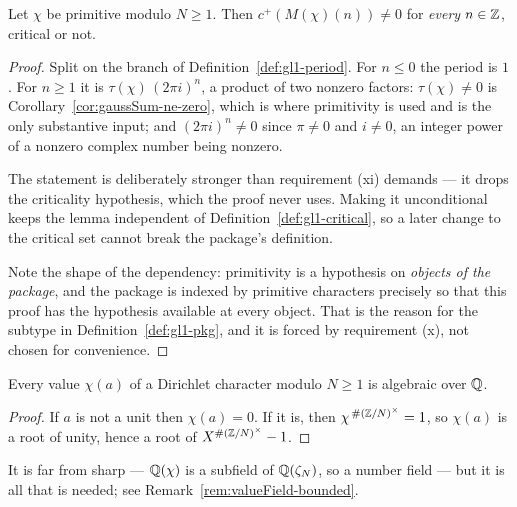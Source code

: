 \begin{lemma}
  \label{lem:gl1-period-ne-zero}
  \leanok
  Let $\chi$ be primitive modulo $N \geq 1$. Then $c^{+}(M(\chi)(n)) \neq 0$ for
  \emph{every} $n \in \mathbb{Z}$, critical or not.
\end{lemma}
\begin{proof}
  \leanok
  Split on the branch of Definition~\ref{def:gl1-period}. For $n \leq 0$ the period is
  $1$. For $n \geq 1$ it is $\tau(\chi)\,(2\pi i)^{n}$, a product of two nonzero
  factors: $\tau(\chi) \neq 0$ is Corollary~\ref{cor:gaussSum-ne-zero}, which is where
  primitivity is used and is the only substantive input; and
  $(2\pi i)^{n} \neq 0$ since $\pi \neq 0$ and $i \neq 0$, an integer power of a
  nonzero complex number being nonzero.

  The statement is deliberately stronger than requirement (xi) demands --- it drops the
  criticality hypothesis, which the proof never uses. Making it unconditional keeps the
  lemma independent of Definition~\ref{def:gl1-critical}, so a later change to the
  critical set cannot break the package's definition.

  Note the shape of the dependency: primitivity is a hypothesis on \emph{objects of the
  package}, and the package is indexed by primitive characters precisely so that this proof
  has the hypothesis available at every object. That is the reason for the subtype in
  Definition~\ref{def:gl1-pkg}, and it is forced by requirement (x), not chosen for
  convenience.
\end{proof}

\begin{lemma}
  \label{lem:values-algebraic}
  \leanok
  Every value $\chi(a)$ of a Dirichlet character modulo $N \geq 1$ is algebraic over $\mathbb{Q}$.
\end{lemma}
\begin{proof}
  \leanok
  If $a$ is not a unit then $\chi(a)=0$. If it is, then
  $\chi^{\,\#(\mathbb{Z}/N)^{\times}} = 1$, so $\chi(a)$ is a root of unity, hence a root of
  $X^{\#(\mathbb{Z}/N)^{\times}} - 1$.
\end{proof}

It is far from sharp --- $\mathbb{Q}(\chi)$ is a subfield of $\mathbb{Q}(\zeta_{N})$, so a number field --- but
it is all that is needed; see Remark~\ref{rem:valueField-bounded}.

